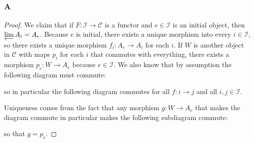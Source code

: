 \documentclass{article}
\newcommand{\id}{\mathrm{id}}
\newcommand{\fI}{\mathscr{I}}
\newcommand{\fC}{\mathscr{C}}
\begin{document}
\subsection{}
\subsubsection{A}\label{1.4.A}
\begin{proof}
    We claim that if $F:\mathscr{I}\to \fC$ is a functor and $e\in \fI$ is an initial object, then $\varprojlim A_i=A_e$. Because $e$ is initial, there exists a unique morphism into every $i\in \fI$, so there exists a unique morphism $f_i:A_e\to A_i$ for each $i$. If $W$ is another object in $\fC$ with maps $p_i$ for each $i$ that commutes with everything, there exists a morphism $p_e:W\to A_e$ because $e\in \fI$. We also know that by assumption the following diagram must commute:
    \begin{center}
    \end{center}
    so in particular the following diagram commutes for all $f:i\to j$ and all $i,j\in \fI$.
    \begin{center}
    \end{center}
    Uniqueness comes from the fact that any morphism $g:W\to A_e$ that makes the diagram commute in particular makes the following subdiagram commute:
    \begin{center}
    \end{center}
    so that $g=p_e$.
\end{proof}
\end{document}

